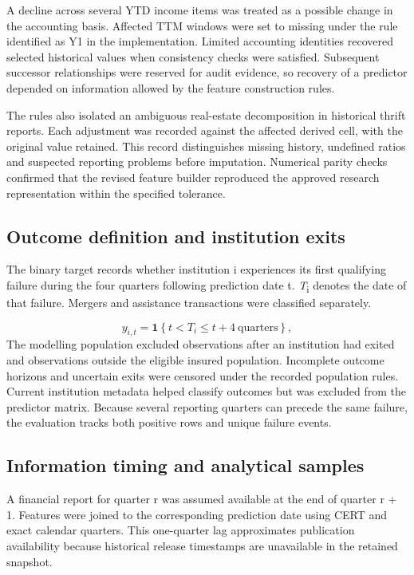 \documentclass[11pt,a4paper]{article}
\begin{document}
A decline across several YTD income items was treated as a possible change in the accounting basis. Affected TTM windows were set to missing under the rule identified as Y1 in the implementation. Limited accounting identities recovered selected historical values when consistency checks were satisfied. Subsequent successor relationships were reserved for audit evidence, so recovery of a predictor depended on information allowed by the feature construction rules.

The rules also isolated an ambiguous real-estate decomposition in historical thrift reports. Each adjustment was recorded against the affected derived cell, with the original value retained. This record distinguishes missing history, undefined ratios and suspected reporting problems before imputation. Numerical parity checks confirmed that the revised feature builder reproduced the approved research representation within the specified tolerance.

\subsection{Outcome definition and institution exits}
The binary target records whether institution i experiences its first qualifying failure during the four quarters following prediction date t. \textit{T}\textsubscript{i} denotes the date of that failure. Mergers and assistance transactions were classified separately.

\begin{equation}
y_{i,t}=\mathbf{1}\!\left\{t<T_i\leq t+4\ \text{quarters}\right\},
\label{eq:1}
\end{equation}
The modelling population excluded observations after an institution had exited and observations outside the eligible insured population. Incomplete outcome horizons and uncertain exits were censored under the recorded population rules. Current institution metadata helped classify outcomes but was excluded from the predictor matrix. Because several reporting quarters can precede the same failure, the evaluation tracks both positive rows and unique failure events.

\subsection{Information timing and analytical samples}
A financial report for quarter r was assumed available at the end of quarter r + 1. Features were joined to the corresponding prediction date using CERT and exact calendar quarters. This one-quarter lag approximates publication availability because historical release timestamps are unavailable in the retained snapshot.
\end{document}
